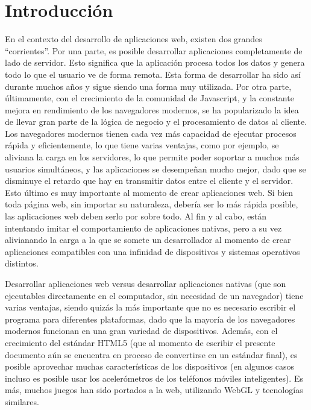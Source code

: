 \documentclass[12pt,spanish,letter]{report}
\begin{document}
\hypersetup{linkcolor=black} \tableofcontents

\clearpage
\newpage

\chapter{Introducción}


En el contexto del desarrollo de aplicaciones web, existen dos grandes
``corrientes''. Por una parte, es posible desarrollar aplicaciones
completamente de lado de servidor. Esto significa que la aplicación
procesa todos los datos y genera todo lo que el usuario ve de forma
remota. Esta forma de desarrollar ha sido así durante muchos años y
sigue siendo una forma muy utilizada. Por otra parte, últimamente, con
el crecimiento de la comunidad de Javascript, y la constante mejora en
rendimiento de los navegadores modernos, se ha popularizado la idea de
llevar gran parte de la lógica de negocio y el procesamiento de datos al
cliente. Los navegadores modernos tienen cada vez más capacidad de
ejecutar procesos rápida y eficientemente, lo que tiene varias ventajas,
como por ejemplo, se aliviana la carga en los servidores, lo que permite
poder soportar a muchos más usuarios simultáneos, y las aplicaciones se
desempeñan mucho mejor, dado que se disminuye el retardo que hay en
transmitir datos entre el cliente y el servidor. Esto último es muy
importante al momento de crear aplicaciones web. Si bien toda página
web, sin importar su naturaleza, debería ser lo más rápida posible, las
aplicaciones web deben serlo por sobre todo. Al fin y al cabo, están
intentando imitar el comportamiento de aplicaciones nativas, pero a su
vez alivianando la carga a la que se somete un desarrollador al momento
de crear aplicaciones compatibles con una infinidad de dispositivos y
sistemas operativos distintos.

Desarrollar aplicaciones web versus desarrollar aplicaciones nativas
(que son ejecutables directamente en el computador, sin necesidad de un
navegador) tiene varias ventajas, siendo quizás la más importante que no
es necesario escribir el programa para diferentes plataformas, dado que
la mayoría de los navegadores modernos funcionan en una gran variedad de
dispositivos. Además, con el crecimiento del estándar HTML5 (que al
momento de escribir el presente documento aún se encuentra en proceso de
convertirse en un estándar final), es posible aprovechar muchas
características de los dispositivos (en algunos casos incluso es posible
usar los acelerómetros de los teléfonos móviles inteligentes). Es más,
muchos juegos han sido portados a la web, utilizando WebGL y tecnologías
similares.
\end{document}

